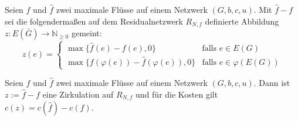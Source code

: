 \begin{nota}Seien $f$ und $\hat{f}$ zwei maximale Flüsse auf einem Netzwerk $(G,b,c,u)$. Mit $\hat{f}-f$ sei die folgendermaßen auf dem Residualnetzwerk $R_{N,f}$ definierte Abbildung $z\colon E(\bar{G})\rightarrow\mathbb{N}_{\geq0}$ gemeint:
\begin{equation*}z(e)=\begin{cases}
\max\{\hat{f}(e)-f(e),0\}&\text{falls } e\in E(G)\\
\max\{f(\varphi(e))-\hat{f}(\varphi(e)),0\}&\text{falls } e\in \varphi(E(G))\end{cases}
\end{equation*}\end{nota}

\begin{lem}\label{f-f}Seien $f$ und $\hat{f}$ zwei maximale Flüsse auf einem Netzwerk $(G,b,c,u)$. Dann ist $z:=\hat{f}-f$ eine Zirkulation auf $R_{N,f}$ und für die Kosten gilt $c(z)=c(\hat{f})-c(f)$.\end{lem}

